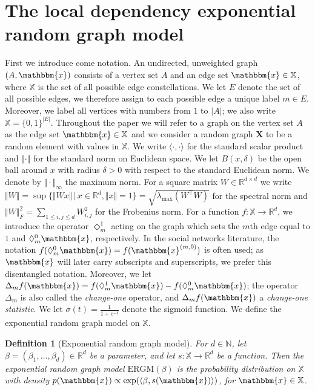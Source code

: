 \documentclass{article}
\newtheorem{Definition}[Theorem]{Definition}
\begin{document}
\section{The local dependency exponential random graph model} \label{section_lergm} 

First we introduce come notation. An undirected, unweighted graph $(A,\mathbbm{x})$ consists of a vertex set $A$ and an edge set $\mathbbm{x} \in \mathbb{X}$, where $\mathbb{X}$ is the set of all possible edge constellations. We let $E$ denote the set of all possible edges, we therefore assign to each possible edge a unique label $m \in E$. Moreover, we label all vertices with numbers from $1$ to $\vert A \vert$; we  also write $\mathbb{X}=\{0,1\}^{\vert E \vert}$. Throughout the paper we will refer to a graph on the vertex set  $A$ as the edge set $\mathbbm{x}  \in \mathbb{X}$ and we consider a random graph $\mathbf{X}$ to be a random element with values in $\mathbb{X}$. We write $\langle \cdot, \cdot \rangle$ for the standard scalar product and $\Vert \cdot \Vert$ for the standard norm on Euclidean space. We  let $B(x,\delta)$ be the open ball around $x$ with radius $\delta>0$ with respect to the standard Euclidean norm. We denote by $\Vert \cdot \Vert_{\infty}$ the maximum norm. For a square matrix $W \in \mathbb{R}^{d\times d}$ we write $\Vert W \Vert = \sup\{\Vert Wx \Vert \, \vert \, x \in \mathbb{R}^d, \Vert x \Vert = 1 \} = \sqrt{\lambda_{\mathrm{max}}(W^{\top}W)}$ for the spectral norm and $\Vert W \Vert_F^2 = \sum_{1 \leq i,j \leq d} W_{i,j}^2 $ for the Frobenius norm. For a  function $f:\mathbb{X} \rightarrow \mathbb{R}^d $, we introduce the operator  $\Diamond_{m}^{1}$  acting on the graph which sets the $m$th edge equal to $1$ and $\Diamond_{m}^{0}\mathbbm{x}$, respectively. In the social networks literature, the notation $f(\Diamond_{m}^{0}\mathbbm{x}) = f( \mathbbm{x}^{(m,0)})$ is often used; as $\mathbbm{x}$ will later carry subscripts and superscripts, we prefer this disentangled notation. Moreover, we let $\Delta_m f(\mathbbm{x})= f(\Diamond_{m}^{1}\mathbbm{x})-f(\Diamond_{m}^{0}\mathbbm{x})$; the operator $\Delta_m$ is also called the {\it change-one} operator, and $\Delta_m f(\mathbbm{x})$ a {\it change-one statistic}. We let  $\sigma(t)=\frac{1}{1+e^{-t}}$ denote the sigmoid function. We define the exponential random graph model on $\mathbb{X}$.
 \par

\begin{Definition}[Exponential random graph model]
    For $d \in \mathbb{N}$, let $\beta = (\beta_1,\ldots,\beta_d) \in \mathbb{R}^d$ be a parameter, and let $s:\mathbb{X} \rightarrow \mathbb{R}^d$ be a function. Then the exponential random graph model $\mathrm{ERGM}(\beta)$ is the probability distribution on $\mathbb{X}$ with density $p(\mathbbm{x}) \propto \exp(\langle \beta, s(\mathbbm{x}) \rangle )$, for $ \mathbbm{x} \in \mathbb{X}$.
\end{Definition}
\end{document}
